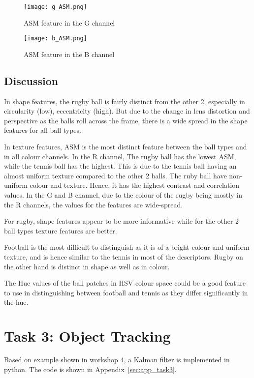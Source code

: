 \documentclass{report}
\begin{document}
\begin{figure}[ht]
    \centering
    \texttt{[image: g\_ASM.png]}
    \caption{ASM feature in the G channel}
    \label{fig:g_ASM}
\end{figure}

\begin{figure}[ht]
    \centering
    \texttt{[image: b\_ASM.png]}
    \caption{ASM feature in the B channel}
    \label{fig:b_ASM}
\end{figure}

\section{Discussion}

In shape features, the rugby ball is fairly distinct from the other 2, especially in circularity (low), eccentricity (high). But due to the change in lens distortion and perspective as the balls roll across the frame, there is a wide spread in the shape features for all ball types.

In texture features, ASM is the most distinct feature between the ball types and in all colour channels. In the R channel, The rugby ball has the lowest ASM, while the tennis ball has the highest. This is due to the tennis ball having an almost uniform texture compared to the other 2 balls. The ruby ball have non-uniform colour and texture. Hence, it has the highest contrast and correlation values. In the G and B channel, due to the colour of the rugby being mostly in the R channels, the values for the features are wide-spread.

For rugby, shape features appear to be more informative while for the other 2 ball types texture features are better.

Football is the most difficult to distinguish as it is of a bright colour and uniform texture, and is hence similar to the tennis in most of the descriptors. Rugby on the other hand is distinct in shape as well as in colour.

The Hue values of the ball patches in HSV colour space could be a good feature to use in distinguishing between football and tennis as they differ significantly in the hue.

\chapter{Task 3: Object Tracking}

Based on example shown in workshop 4, a Kalman filter\cite{kalmanNewApproachLinear1960} is implemented in python. The code is shown in Appendix~\ref{sec:app_task3}.
\end{document}
